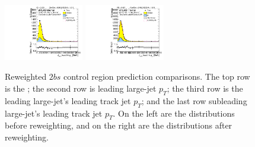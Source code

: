 \begin{figure}[htbp!]
\begin{center}
\includegraphics[width=0.31\textwidth,angle=-90]{figures/boosted/Prereweight/Moriond_TwoTag_split_Control_sublHCand_trk0_Pt.pdf}
\includegraphics[width=0.31\textwidth,angle=-90]{figures/boosted/Control/b77_TwoTag_split_Control_sublHCand_trk0_Pt.pdf}\\
\caption{Reweighted $2bs$ control region prediction comparisons. The top row is the \mtwoJ; the second row is leading large-\R jet $p_{T}$; the third row is the leading large-\R jet's leading track jet $p_T$; and the last row subleading large-\R jet's leading track jet $p_T$. On the left are the distributions before reweighting, and on the right are the distributions after reweighting.}
\label{fig:rw-2bs-comp-cr}
\end{center}
\end{figure}


